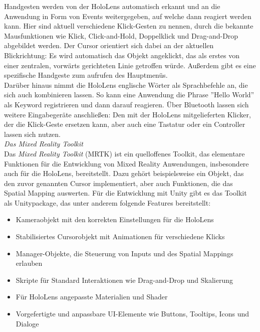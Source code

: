 Handgesten werden von der HoloLens automatisch erkannt und an die Anwendung in Form von Events weitergegeben, auf welche dann reagiert werden kann. Hier sind aktuell verschiedene Klick-Gesten zu nennen, durch die bekannte Mausfunktionen wie Klick, Click-and-Hold, Doppelklick und Drag-and-Drop abgebildet werden. Der Cursor orientiert sich dabei an der aktuellen Blickrichtung: Es wird automatisch das Objekt angeklickt, das als erstes von einer zentralen, vorwärts gerichteten Linie getroffen würde. Außerdem gibt es eine spezifische Handgeste zum aufrufen des Hauptmenüs.\\

Darüber hinaus nimmt die HoloLens englische Wörter als Sprachbefehle an, die sich auch kombinieren lassen. So kann eine Anwendung die Phrase ''Hello World'' als Keyword registrieren und dann darauf reagieren. Über Bluetooth lassen sich weitere Eingabegeräte anschließen: Den mit der HoloLens mitgelieferten Klicker, der die Klick-Geste ersetzen kann, aber auch eine Tastatur oder ein Controller lassen sich nutzen.\\

\vspace{4px}
\textit{Das Mixed Reality Toolkit}\\
Das \textit{Mixed Reality Toolkit} (MRTK) ist ein quelloffenes Toolkit, das elementare Funktionen für die Entwicklung von Mixed Reality Anwendungen, insbesondere auch für die HoloLens, bereitstellt. Dazu gehört beispielsweise ein Objekt, das den zuvor genannten Cursor implementiert, aber auch Funktionen, die das Spatial Mapping auswerten. Für die Entwicklung mit Unity gibt es das Toolkit als Unitypackage, das unter anderem folgende Features bereitstellt:

\begin{itemize}[topsep=-2px]
	\setlength{\itemsep}{-1pt}
	\singlespacing
	\item Kameraobjekt mit den korrekten Einstellungen für die HoloLens
	\item Stabilisiertes Cursorobjekt mit Animationen für verschiedene Klicks
	\item Manager-Objekte, die Steuerung von Inputs und des Spatial Mappings erlauben
	\item Skripte für Standard Interaktionen wie Drag-and-Drop und Skalierung
	\item Für HoloLens angepasste Materialien und Shader
	\item Vorgefertigte und anpassbare UI-Elemente wie Buttons, Tooltips, Icons und Dialoge
\end{itemize}
\vspace{6px}

